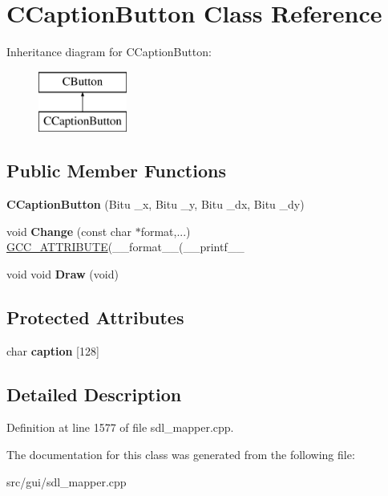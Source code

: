\hypertarget{classCCaptionButton}{\section{C\-Caption\-Button Class Reference}
\label{classCCaptionButton}
}
Inheritance diagram for C\-Caption\-Button\-:\begin{figure}[H]
\begin{center}
\leavevmode
\includegraphics[height=2.000000cm]{classCCaptionButton}
\end{center}
\end{figure}
\subsection*{Public Member Functions}
\begin{DoxyCompactItemize}
\item 
\hypertarget{classCCaptionButton_ab3693869d536d69e5a5c206f22865583}{{\bfseries C\-Caption\-Button} (Bitu \-\_\-x, Bitu \-\_\-y, Bitu \-\_\-dx, Bitu \-\_\-dy)}\label{classCCaptionButton_ab3693869d536d69e5a5c206f22865583}

\item 
\hypertarget{classCCaptionButton_a497661808a80201830f2241f75750e90}{void {\bfseries Change} (const char $\ast$format,...) \hyperlink{structGCC__ATTRIBUTE}{G\-C\-C\-\_\-\-A\-T\-T\-R\-I\-B\-U\-T\-E}(\-\_\-\-\_\-format\-\_\-\-\_\-(\-\_\-\-\_\-printf\-\_\-\-\_\-}\label{classCCaptionButton_a497661808a80201830f2241f75750e90}

\item 
\hypertarget{classCCaptionButton_a953f5b12ba13b61bc373fc3d25295079}{void void {\bfseries Draw} (void)}\label{classCCaptionButton_a953f5b12ba13b61bc373fc3d25295079}

\end{DoxyCompactItemize}
\subsection*{Protected Attributes}
\begin{DoxyCompactItemize}
\item 
\hypertarget{classCCaptionButton_a6e015cc9759137aa04d7c54bd936233b}{char {\bfseries caption} \mbox{[}128\mbox{]}}\label{classCCaptionButton_a6e015cc9759137aa04d7c54bd936233b}

\end{DoxyCompactItemize}


\subsection{Detailed Description}


Definition at line 1577 of file sdl\-\_\-mapper.\-cpp.



The documentation for this class was generated from the following file\-:\begin{DoxyCompactItemize}
\item 
src/gui/sdl\-\_\-mapper.\-cpp\end{DoxyCompactItemize}
